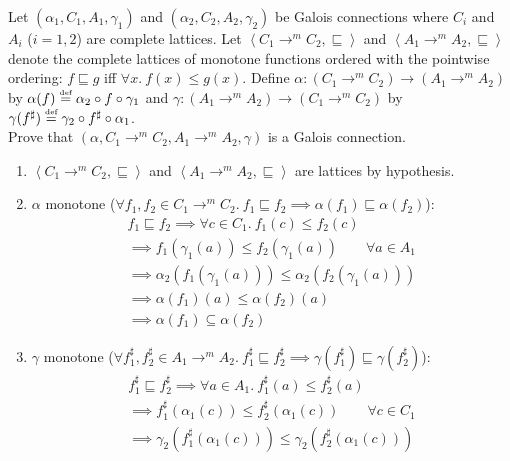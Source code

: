 \begin{exercise}{
    Let $(\alpha_1, C_1, A_1, \gamma_1)$ and $(\alpha_2, C_2, A_2, \gamma_2)$ be Galois connections where $C_i$ and $A_i$ ($i = 1,2$) are complete lattices. Let $\left<C_1 \to^m C_2, \sqsubseteq\right>$ and $\left<A_1 \to^m A_2, \sqsubseteq\right>$ denote the complete lattices of monotone functions ordered with the pointwise ordering: $f \sqsubseteq g$ iff $\forall x.\ f(x) \leq g(x)$. Define $\alpha : (C_1 \to^m C_2) \to (A_1 \to^m A_2)$ by $\alpha(f) \overset{\text{\tiny def}}{=} \alpha_2 \circ f \circ \gamma_1$ and $\gamma: (A_1 \to^m A_2) \to (C_1 \to^m C_2)$ by $\gamma(f^\sharp) \overset{\text{\tiny def}}{=} \gamma_2 \circ f^\sharp \circ \alpha_1$. \\
    Prove that $(\alpha, C_1 \to^m C_2, A_1 \to^m A_2, \gamma)$ is a Galois connection.
}
    \begin{enumerate}[1.]
        \item $\left<C_1 \to^m C_2, \sqsubseteq\right>$ and $\left<A_1 \to^m A_2, \sqsubseteq\right>$ are lattices by hypothesis.
        \item $\alpha$ monotone ($\forall f_1, f_2 \in C_1 \to^m C_2.\ f_1 \sqsubseteq f_2 \implies \alpha(f_1) \sqsubseteq \alpha(f_2)$):
        \begin{gather*}
            f_1 \sqsubseteq f_2 \implies \forall c \in C_1.\ f_1 (c) \leq f_2 (c) \\
            \implies f_1 (\gamma_1 (a)) \leq f_2 (\gamma_1 (a)) \qquad \forall a \in A_1 \\
            \implies \alpha_2 (f_1 (\gamma_1 (a))) \leq \alpha_2 (f_2 (\gamma_1 (a))) \\
            \implies \alpha(f_1)(a) \leq \alpha(f_2)(a) \\
            \implies \alpha(f_1) \subseteq \alpha(f_2)
        \end{gather*}
        \item $\gamma$ monotone ($\forall f^\sharp_1, f^\sharp_2 \in A_1 \to^m A_2.\ f^\sharp_1 \sqsubseteq f^\sharp_2 \implies \gamma(f^\sharp_1) \sqsubseteq \gamma(f^\sharp_2)$):
        \begin{gather*}
            f^\sharp_1 \sqsubseteq f^\sharp_2 \implies \forall a \in A_1.\ f^\sharp_1 (a) \leq f^\sharp_2 (a) \\
            \implies f^\sharp_1 (\alpha_1 (c)) \leq f^\sharp_2 (\alpha_1 (c)) \qquad \forall c \in C_1  \\
            \implies \gamma_2 (f^\sharp_1 (\alpha_1 (c))) \leq \gamma_2 (f^\sharp_2 (\alpha_1 (c))) \\

\end{gather*}
\end{enumerate}
\end{exercise}
